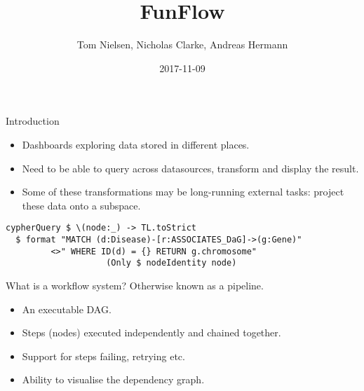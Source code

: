 \documentclass[11pt]{beamer}
\author{Tom Nielsen, Nicholas Clarke, Andreas Hermann}
\title{FunFlow}
\date{2017-11-09}
\begin{document}
\begin{frame}
\titlepage
\end{frame}

\begin{frame}[fragile]{Introduction}
\begin{itemize}
\item Dashboards exploring data stored in different places.
\item Need to be able to query across datasources, transform and display the result.
\item Some of these transformations may be long-running external tasks: project these data onto a subspace.
\end{itemize}
\begin{lstlisting}[basicstyle=\tiny]
cypherQuery $ \(node:_) -> TL.toStrict
  $ format "MATCH (d:Disease)-[r:ASSOCIATES_DaG]->(g:Gene)"  
         <>" WHERE ID(d) = {} RETURN g.chromosome"
                    (Only $ nodeIdentity node)
\end{lstlisting}
\end{frame}

\begin{frame}{What is a workflow system?}
Otherwise known as a pipeline.
\begin{itemize}
\item An executable DAG.
\item Steps (nodes) executed independently and chained together.
\item Support for steps failing, retrying etc.
\item Ability to visualise the dependency graph.
\end{itemize}
\end{frame}
\end{document}
